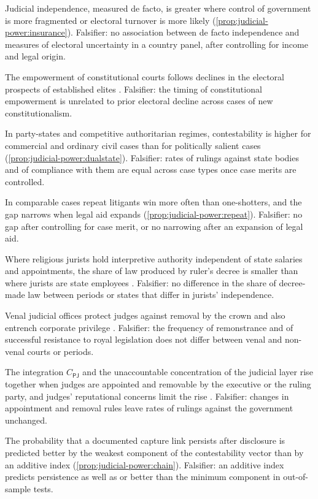 \documentclass[11pt,letterpaper]{article}
\theoremstyle{definition}
\theoremstyle{remark}
\newcommand{\pP}{\mathsf{P}}
\newcommand{\pJ}{\mathsf{J}}
\begin{document}
\begin{description}[font=\normalfont\itshape,leftmargin=1.5em,style=nextline]
\item[HJ1, insurance.] Judicial independence, measured de facto, is greater where control of government is more fragmented or electoral turnover is more likely (\cref{prop:judicial-power:insurance}). Falsifier: no association between de facto independence and measures of electoral uncertainty in a country panel, after controlling for income and legal origin.
\item[HJ2, hegemonic preservation.] The empowerment of constitutional courts follows declines in the electoral prospects of established elites \citep{hirschl2004}. Falsifier: the timing of constitutional empowerment is unrelated to prior electoral decline across cases of new constitutionalism.
\item[HJ3, two tiers.] In party-states and competitive authoritarian regimes, contestability is higher for commercial and ordinary civil cases than for politically salient cases (\cref{prop:judicial-power:dualstate}). Falsifier: rates of rulings against state bodies and of compliance with them are equal across case types once case merits are controlled.
\item[HJ4, repeat players.] In comparable cases repeat litigants win more often than one-shotters, and the gap narrows when legal aid expands (\cref{prop:judicial-power:repeat}). Falsifier: no gap after controlling for case merit, or no narrowing after an expansion of legal aid.
\item[HJ5, juristic autonomy.] Where religious jurists hold interpretive authority independent of state salaries and appointments, the share of law produced by ruler's decree is smaller than where jurists are state employees \citep{hallaq2009}. Falsifier: no difference in the share of decree-made law between periods or states that differ in jurists' independence.
\item[HJ6, venality.] Venal judicial offices protect judges against removal by the crown and also entrench corporate privilege \citep{doyle1996}. Falsifier: the frequency of remonstrance and of successful resistance to royal legislation does not differ between venal and non-venal courts or periods.
\item[HJ7, fusion.] The integration $C_{\pP\pJ}$ and the unaccountable concentration of the judicial layer rise together when judges are appointed and removable by the executive or the ruling party, and judges' reputational concerns limit the rise \citep{helmke2005}. Falsifier: changes in appointment and removal rules leave rates of rulings against the government unchanged.
\item[HJ8, review chains.] The probability that a documented capture link persists after disclosure is predicted better by the weakest component of the contestability vector than by an additive index (\cref{prop:judicial-power:chain}). Falsifier: an additive index predicts persistence as well as or better than the minimum component in out-of-sample tests.
\end{description}
\end{document}
